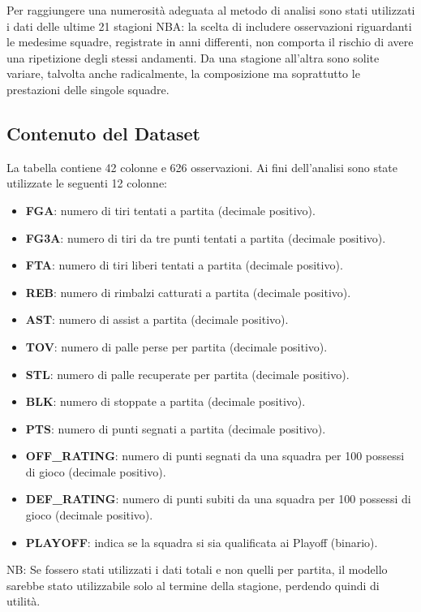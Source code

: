 \documentclass[11pt,a4paper]{article}
\begin{document}
Per raggiungere una numerosità adeguata al metodo di analisi sono stati utilizzati i dati delle ultime 21 stagioni NBA: la scelta di includere osservazioni riguardanti le medesime squadre, registrate in anni differenti, non comporta il rischio di avere una ripetizione degli stessi andamenti. Da una stagione all'altra sono solite variare, talvolta anche radicalmente, la composizione ma soprattutto le prestazioni delle singole squadre. 

\subsection{Contenuto del Dataset}
La tabella contiene 42 colonne e 626 osservazioni. Ai fini dell'analisi sono state utilizzate le seguenti 12 colonne: 
\begin{itemize}
    \item \textbf{FGA}: numero di tiri tentati a partita (decimale positivo).
    \item \textbf{FG3A}: numero di tiri da tre punti tentati a partita (decimale positivo).
    \item \textbf{FTA}: numero di tiri liberi tentati a partita (decimale positivo).
    \item \textbf{REB}: numero di rimbalzi catturati a partita (decimale positivo).
    \item \textbf{AST}: numero di assist a partita (decimale positivo).
    \item \textbf{TOV}: numero di palle perse per partita (decimale positivo).
    \item \textbf{STL}: numero di palle recuperate per partita (decimale positivo).
    \item \textbf{BLK}: numero di stoppate a partita (decimale positivo).
    \item \textbf{PTS}: numero di punti segnati a partita (decimale positivo).
    \item \textbf{OFF\_RATING}: numero di punti segnati da una squadra per 100 possessi di gioco (decimale positivo).
    \item \textbf{DEF\_RATING}: numero di punti subiti da una squadra per 100 possessi di gioco (decimale positivo).
    \item \textbf{PLAYOFF}: indica se la squadra si sia qualificata ai Playoff (binario).
\end{itemize}

NB: Se fossero stati utilizzati i dati totali e non quelli per partita, il modello sarebbe stato utilizzabile solo al termine della stagione, perdendo quindi di utilità.
\end{document}

